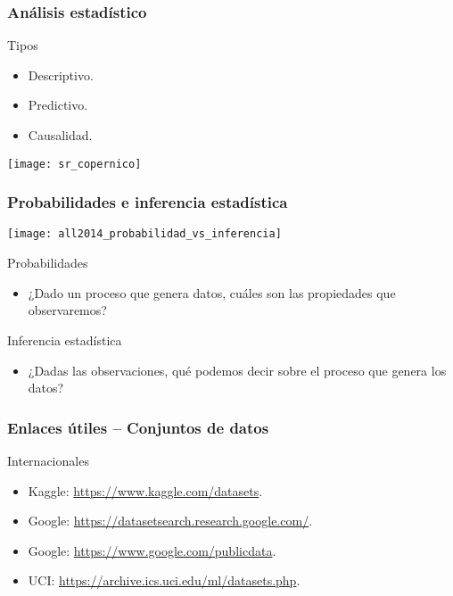 \documentclass[table]{beamer}
\begin{document}
\begin{frame}
    \frametitle{Análisis estadístico}
    \begin{block}{Tipos}
        \begin{itemize}
            \item Descriptivo.
            \item Predictivo.
            \item Causalidad.
        \end{itemize}
    \end{block}
    \begin{center}
        \texttt{[image: sr\_copernico]}
    \end{center}
\end{frame}

\begin{frame}
    \frametitle{Probabilidades e inferencia estadística}
    \begin{center}
        \texttt{[image: all2014\_probabilidad\_vs\_inferencia]}
    \end{center}
    \begin{block}{Probabilidades}
        \begin{itemize}
            \item ¿Dado un proceso que genera datos, cuáles son las propiedades que observaremos?
        \end{itemize}
    \end{block}
    \begin{block}{Inferencia estadística}
        \begin{itemize}
            \item ¿Dadas las observaciones, qué podemos decir sobre el proceso que genera los datos?
        \end{itemize}
    \end{block}
\end{frame}

\begin{frame}
    \frametitle{Enlaces útiles -- Conjuntos de datos}
    \begin{block}{Internacionales}
        \begin{itemize}
            \item Kaggle: \url{https://www.kaggle.com/datasets}.
            \item Google: \url{https://datasetsearch.research.google.com/}.
            \item Google: \url{https://www.google.com/publicdata}.
            \item UCI: \url{https://archive.ics.uci.edu/ml/datasets.php}.
        \end{itemize}
    \end{block}
\end{frame}
\end{document}
